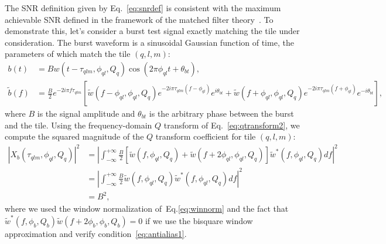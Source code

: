 The SNR definition given by Eq.~\ref{eq:snrdef} is consistent with the maximum achievable SNR defined in the framework of the matched filter theory~\cite{helstrom:1968}. To demonstrate this, let's consider a burst test signal exactly matching the tile under consideration. The burst waveform is a sinusoidal Gaussian function of time, the parameters of which match the tile $(q,l,m)$:
\begin{align}
  b(t) &= Bw(t-\tau_{qlm}, \phi_{ql}, Q_q)\cos(2\pi\phi_{ql} t + \theta_{bt}),\\
  \tilde{b}(f) &= \frac{B}{2}e^{-2i\pi f\tau_{qlm}}\left[ \tilde{w}(f-\phi_{ql},\phi_{ql},Q_q)e^{-2i\pi\tau_{qlm}(f-\phi_{ql})}e^{i\theta_{bt}}+\tilde{w}(f+\phi_{ql},\phi_{ql},Q_q)e^{-2i\pi\tau_{qlm}(f+\phi_{ql})}e^{-i\theta_{bt}}\right],
\end{align}
where $B$ is the signal amplitude and $\theta_{bt}$ is the arbitrary phase between the burst and the tile. Using the frequency-domain $Q$ transform of Eq.~\ref{eq:qtransform2}, we compute the squared magnitude of the $Q$ transform coefficient for tile $(q,l,m)$:
\begin{align}
  |X_b(\tau_{qlm}, \phi_{ql}, Q_q)|^2 &= \left|\int_{-\infty}^{+\infty}{ \frac{B}{2}\left[ \tilde{w}(f,\phi_{ql},Q_q)+\tilde{w}(f+2\phi_{ql},\phi_{ql},Q_q)\right] \tilde{w}^{*}(f,\phi_{ql},Q_q) df} \right|^2\\
  &= \left|\int_{-\infty}^{+\infty}{ \frac{B}{2} \tilde{w}(f,\phi_{ql},Q_q) \tilde{w}^{*}(f,\phi_{ql},Q_q) df}\right|^2 \\
  &= B^2,
  \label{eq:qtransform_signal}
\end{align}
where we used the window normalization of~Eq.\ref{eq:winnorm} and the fact that $\tilde{w}^{*}(f,\phi_b,Q_b)\tilde{w}(f+2\phi_b,\phi_b,Q_b)=0$ if we use the bisquare window approximation and verify condition~\ref{eq:antialias1}.

